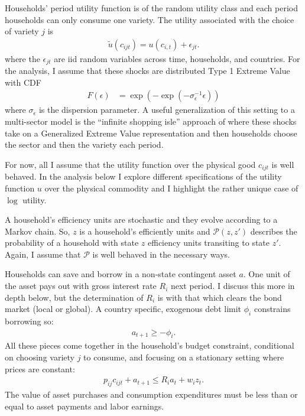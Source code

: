 \documentclass[12pt,pdftex]{article}
\begin{document}
\begin{onehalfspacing}
Households' period utility function is of the random utility class and each period households can only consume one variety. The utility associated with the choice of variety $j$ is
\begin{align}
\tilde{u}( c_{ijt} ) =  u(c_{i,t}) + \epsilon_{jt}. \label{eq:utility}
\end{align}
where the $\epsilon_{jt}$ are iid random variables across time, households, and countries. For the analysis, I assume that these shocks are distributed Type 1 Extreme Value with CDF
\begin{align}
F(\epsilon) &= \exp(-\exp(-\sigma_{\epsilon}^{-1}\epsilon))
\end{align}
where $\sigma_{\epsilon}$ is the dispersion parameter. A useful generalization of this setting to a multi-sector model is the ``infinite shopping isle'' approach of \citet{p-iq} where these shocks take on a Generalized Extreme Value representation and then households choose the sector and then the variety each period.

For now, all I assume that the utility function over the physical good $c_{ijt}$ is well behaved. In the analysis below I explore different specifications of the utility function $u$ over the physical commodity and I highlight the rather unique case of $\log$ utility.

A household's efficiency units are stochastic and they evolve according to a Markov chain. So, $z$ is a household's efficiently units and $\mathcal{P}(z,z')$ describes the probability of a household with state $z$ efficiency units transiting to state $z'$. Again, I assume that $\mathcal{P}$ is well behaved in the necessary ways.

Households can save and borrow in a non-state contingent asset $a$. One unit of the asset pays out with gross interest rate $R_i$ next period. I discuss this more in depth below, but the determination of $R_{i}$ is with that which clears the bond market (local or global). A country specific, exogenous debt limit $\phi_{i}$ constrains borrowing so:
\begin{align}
a_{t+1} \geq - \phi_{i}.
\label{eq:borrowing-constraint}
\end{align}
All these pieces come together in the household's budget constraint, conditional on choosing variety $j$ to consume, and focusing on a stationary setting where prices are constant:
\begin{align}
p_{ij}c_{ijt} +  a_{t+1} \leq    R_{i} a_{t} + w_{i} z_{t}.\label{eq:trade-budget-constraint}
\end{align}
The value of asset purchases and consumption expenditures must be less than or equal to asset payments and labor earnings.


\end{onehalfspacing}
\end{document}
